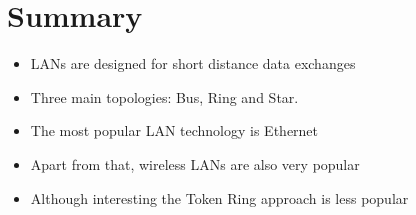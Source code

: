 \documentclass{beamer}[10pt, usepdftitle=false, handout]
\begin{document}
	\section{Summary}
	
	\begin{frame}
	
	\begin{itemize}
	\item{LANs are designed for short distance data exchanges}
	\item{Three main topologies: Bus, Ring and Star.}
	\item{The most popular LAN technology is Ethernet}
	\item{Apart from that, wireless LANs are also very popular}
	\item{Although interesting the Token Ring approach is less popular}
	\end{itemize}		
		
	\end{frame}	
	
		
	
\end{document}
